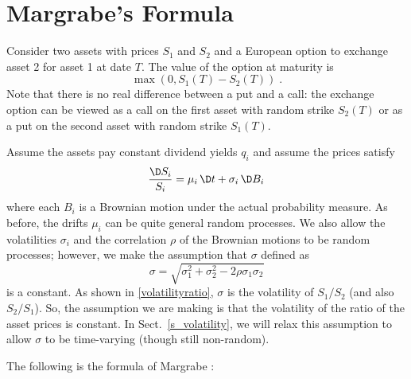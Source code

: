 \section{Margrabe's Formula}\label{s_margrabe}

Consider two assets with prices $S_1$ and $S_2$ and a European option to exchange asset 2 for asset 1 at date $T$.  The value of the option at maturity is
$$\max(0,S_1(T)-S_2(T))\; .$$
Note that there is no real difference between a put and a call:  the exchange option  can be viewed as a call on the first asset with random strike $S_2(T)$ or as a put on the second asset with random strike $S_1(T)$.

Assume the assets pay constant dividend yields $q_i$ and assume the prices satisfy
$$\frac{\D S_i}{S_i} = \mu_i\,\D t+\sigma_i\,\D B_i$$
where each $B_i$ is a Brownian motion under the actual probability measure.  As before, the drifts $\mu_i$ can be quite general random processes.  We also allow the volatilities $\sigma_i$ and the correlation $\rho$ of the Brownian motions to be random processes; however, we make the assumption that $\sigma$ defined as
\begin{equation}\label{margrabesigma}
\sigma = \sqrt{\sigma_1^2 + \sigma_2^2 - 2\rho\sigma_1\sigma_2}
\end{equation}
is a constant.  As shown in \eqref{volatilityratio}, $\sigma$ is the volatility of $S_1/S_2$ (and also $S_2/S_1$).  So, the assumption we are making is that the volatility of the ratio of the asset prices is constant.  In Sect.~\ref{s_volatility}, we will relax this assumption to allow $\sigma$ to be time-varying (though still non-random).  

The following is the formula of Margrabe \cite{Margrabe}: 


